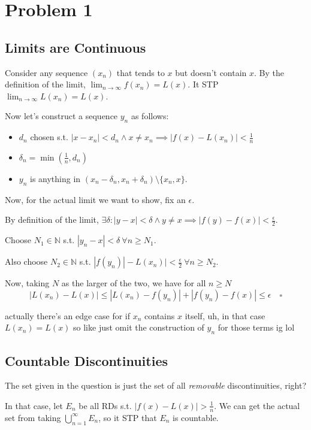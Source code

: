 \documentclass[12pt]{article}
\newcommand{\N}{\mathbb{N}}
\begin{document}
\section{Problem 1}

\subsection{Limits are Continuous}

Consider any sequence $(x_n)$ that tends to $x$ but doesn't contain $x$.
By the definition of the limit, $\lim_{n \to \infty} f(x_n) = L(x)$.
It STP $\lim_{n \to \infty} L(x_n) = L(x)$.

Now let's construct a sequence $y_n$ as follows:
\begin{itemize}[nolistsep]
  \item $d_n$ chosen s.t. $|x-x_n| < d_n \land x \ne x_n \implies |f(x)-L(x_n)| < \frac{1}{n}$
  \item $\delta_n=\min\left(\frac{1}{n}, d_n\right)$
  \item $y_n$ is anything in $(x_n-\delta_n, x_n+\delta_n) \setminus \{x_n, x\}$.
\end{itemize}

Now, for the actual limit we want to show, fix an $\epsilon$.

By definition of the limit, $\exists \delta: |y-x| < \delta \land y \ne x \implies |f(y)-f(x)| < \frac{\epsilon}{2}$.

Choose $N_1 \in \N$ s.t. $|y_n-x| < \delta\ \forall n \ge N_1$.

Also choose $N_2 \in \N$ s.t. $|f(y_n)|-L(x_n)| < \frac{\epsilon}{2}\ \forall n \ge N_2$.

Now, taking $N$ as the larger of the two, we have for all $n \ge N$
\[|L(x_n)-L(x)| \le |L(x_n)-f(y_n)|+|f(y_n)-f(x)| \le \epsilon\quad\square\]

actually there's an edge case for if $x_n$ contains $x$ itself, uh,
in that case $L(x_n)=L(x)$ so like just omit the construction of $y_n$ for those terms ig lol

\subsection{Countable Discontinuities}

The set given in the question is just the set of all \textit{removable} discontinuities, right?

In that case, let $E_n$ be all RDs s.t. $|f(x)-L(x)| > \frac{1}{n}$.
We can get the actual set from taking $\bigcup_{n=1}^\infty E_n$,
so it STP that $E_n$ is countable.
\end{document}
